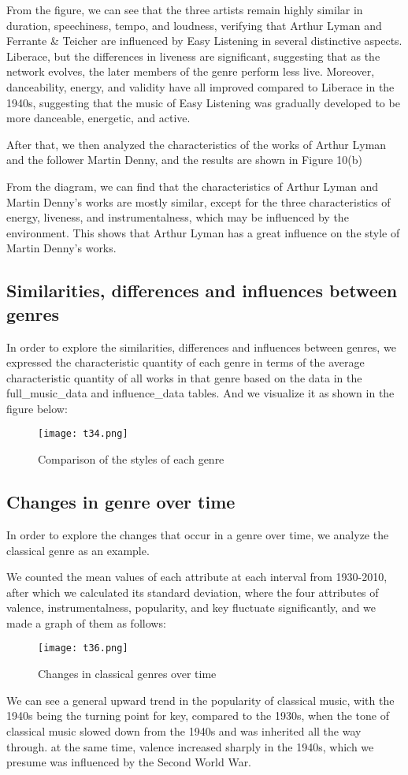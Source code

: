 \documentclass[12pt]{article}  %
\begin{document}
From the figure, we can see that the three artists remain highly similar in duration, speechiness, tempo, and loudness, verifying that Arthur Lyman and Ferrante \& Teicher are influenced by Easy Listening in several distinctive aspects. Liberace, but the differences in liveness are significant, suggesting that as the network evolves, the later members of the genre perform less live. Moreover, danceability, energy, and validity have all improved compared to Liberace in the 1940s, suggesting that the music of Easy Listening was gradually developed to be more danceable, energetic, and active.

After that, we then analyzed the characteristics of the works of Arthur Lyman and the follower Martin Denny, and the results are shown in Figure 10(b)

From the diagram, we can find that the characteristics of Arthur Lyman and Martin Denny's works are mostly similar, except for the three characteristics of energy, liveness, and instrumentalness, which may be influenced by the environment. This shows that Arthur Lyman has a great influence on the style of Martin Denny's works.

\subsection{Similarities, differences and influences between genres}
In order to explore the similarities, differences and influences between genres, we expressed the characteristic quantity of each genre in terms of the average characteristic quantity of all works in that genre based on the data in the full\_music\_data and influence\_data tables. And we visualize it as shown in the figure below:

\begin{figure}[H]
	\centering
	\texttt{[image: t34.png]} 	%
	\caption{Comparison of the styles of each genre}		%
	\label{fig:ex4-9}
\end{figure}

\subsection{Changes in genre over time}
In order to explore the changes that occur in a genre over time, we analyze the classical genre as an example.

We counted the mean values of each attribute at each interval from 1930-2010, after which we calculated its standard deviation, where the four attributes of valence, instrumentalness, popularity, and key fluctuate significantly, and we made a graph of them as follows:
\begin{figure}[H]
	\centering
	\texttt{[image: t36.png]} 	%
	\caption{Changes in classical genres over time}		%
	\label{fig:ex4-9}
\end{figure}
We can see a general upward trend in the popularity of classical music, with the 1940s being the turning point for key, compared to the 1930s, when the tone of classical music slowed down from the 1940s and was inherited all the way through. at the same time, valence increased sharply in the 1940s, which we presume was influenced by the Second World War. 
\end{document}
